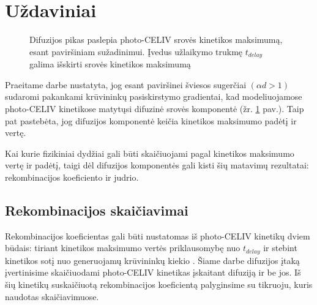 \section{Uždaviniai}

\begin{figure}
  \centering
  \caption{Difuzijos pikas paslepia photo-CELIV srovės kinetikos maksimumą, esant paviršiniam sužadinimui. Įvedus užlaikymo trukmę $t_{delay}$ galima išskirti srovės kinetikos maksimumą}
  \label{fig:celiv_example}
\end{figure}

Praeitame darbe \cite{vytis:kursinis} nustatyta, jog esant paviršinei šviesos sugerčiai $(\alpha d > 1)$ sudaromi pakankami krūvininkų pasiskirstymo gradientai, kad modeliuojamose photo-CELIV kinetikose matytųsi difuzinė srovės komponentė (žr. \ref{fig:celiv_example} pav.). Taip pat pastebėta, jog difuzijos komponentė keičia kinetikos maksimumo padėtį ir vertę.

Kai kurie fizikiniai dydžiai gali būti skaičiuojami pagal kinetikos maksimumo vertę ir padėtį, taigi dėl difuzijos komponentės gali kisti šių matavimų rezultatai: rekombinacijos koeficiento ir judrio.

\subsection{Rekombinacijos skaičiavimai}

Rekombinacijos koeficientas gali būti nustatomas iš photo-CELIV kinetikų dviem būdais: tiriant kinetikos maksimumo vertės priklausomybę nuo \(t_{delay}\) ir 
stebint kinetikos sotį nuo generuojamų krūvininkų kiekio \cite{juška:155202}.
Šiame darbe difuzijos įtaką įvertinisime skaičiuodami photo-CELIV kinetikas įskaitant difuziją ir be jos. Iš šių kinetikų suskaičiuotą rekombinacijos koeficientą palyginsime su tikruoju, kuris naudotas skaičiavimuose.


